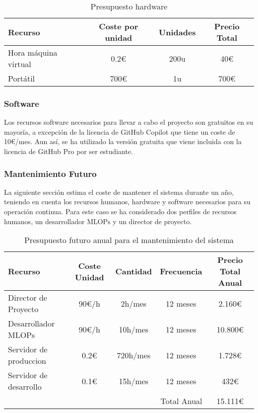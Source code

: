 \begin{table}[ht]
    \centering
    \begin{tabular}[ht]{l|c|c|c}
        \textbf{Recurso}     & \textbf{Coste por unidad} & \textbf{Unidades} & \textbf{Precio Total} \\
        \hline
        Hora máquina virtual & 0.2\euro                  & 200u              & 40\euro               \\
        Portátil             & 700\euro                  & 1u                & 700\euro              \\
    \end{tabular}
    \caption{Presupuesto hardware}
    \label{tab:hardware-budget}
\end{table}

\subsubsection{Software}
Los recursos software necesarios para llevar a cabo el proyecto son gratuitos
en su mayoría, a excepción de la licencia de GitHub Copilot que tiene un coste
de 10\euro/mes. Aun así, se ha utilizado la versión gratuita que viene incluida
con la licencia de GitHub Pro por ser estudiante.

\subsubsection{Mantenimiento Futuro}
La siguiente sección estima el coste de mantener el sistema durante un año, teniendo 
en cuenta los recursos humanos, hardware y software necesarios para su operación continua.
Para este caso se ha considerado dos perfiles de recursos humanos, un desarrollador MLOPs
y un director de proyecto. 

\begin{table}[h]
    \centering
    \begin{tabular}[H]{l|c|c|c|c}
        \textbf{Recurso}           & \textbf{Coste Unidad} & \textbf{Cantidad} & \textbf{Frecuencia} & \textbf{Precio Total Anual} \\
        \hline
        Director de Proyecto        & 90\euro/h             & 2h/mes            & 12 meses           & 2.160\euro \\
        Desarrollador MLOPs         & 90\euro/h             & 10h/mes           & 12 meses           & 10.800\euro \\
        Servidor de produccion       & 0.2\euro              & 720h/mes         & 12 meses           & 1.728\euro   \\
        Servidor de desarrollo       & 0.1\euro              & 15h/mes          & 12 meses           & 432\euro   \\
        \hline
        \multicolumn{4}{r|}{Total Anual} & 15.111\euro \\
    \end{tabular}
    \caption{Presupuesto futuro anual para el mantenimiento del sistema}
    \label{tab:future-budget}
\end{table}

